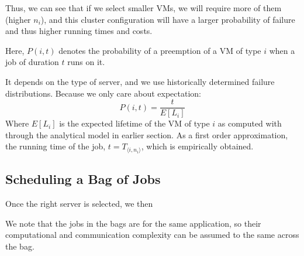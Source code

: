 Thus, we can see that if we select smaller VMs, we will require more of them (higher $n_i$), and this cluster configuration will have a larger probability of failure and thus higher running times and costs. 

Here, $P(i, t)$ denotes the probability of a preemption of a VM of type $i$ when a job of duration $t$ runs on it. 

It depends on the type of server, and we use historically determined failure distributions.
Because we only care about expectation: 
\begin{equation}
  \label{eq:pi}
  P(i, t) = \dfrac{t}{E[L_i]}
\end{equation}
Where $E[L_i]$ is the expected lifetime of the VM of type $i$ as computed with through the analytical model in earlier section.
As a first order approximation, the running time of the job, $t=T_{\langle i,n_i \rangle}$, which is empirically obtained. 




\subsection{Scheduling a Bag of Jobs}

Once the right server is selected, we then 

We note that the jobs in the bags are for the same application, so their computational and communication complexity can be assumed to the same across the bag. 




\begin{comment}

  Our server selection policy is empirical and black-box in nature in that we don't assume an application model.
However due to the bag of jobs execution model, we do not need to special pilot jobs, but the jobs for doing the profiling come from the bag itself.


Thus given a desired allocation, \sysname's server selection policies select the ``best'' server type for a given application. 

One of key characteristics of transient cloud computing is the heterogeneity and diversity in the server configurations offered by most cloud platforms. 
Different configurations or types of servers have different prices 

\end{comment}



